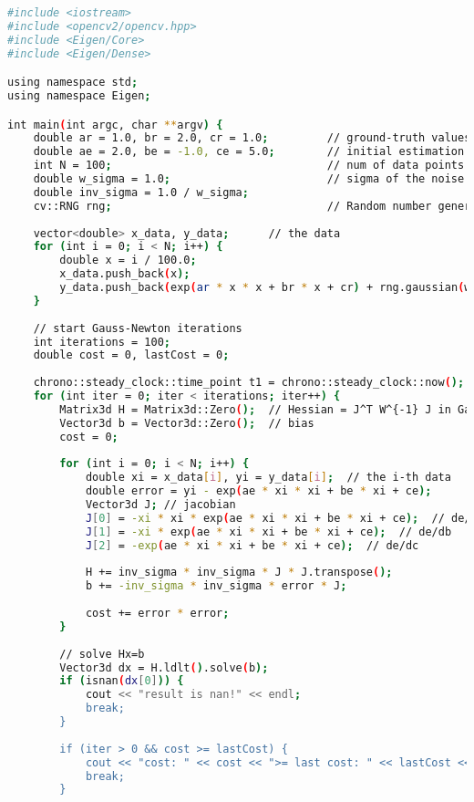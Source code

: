 \begin{lstlisting}[language=sh,caption=slambook2/ch6/gaussNewton.cpp]
#include <iostream>
#include <opencv2/opencv.hpp>
#include <Eigen/Core>
#include <Eigen/Dense>

using namespace std;
using namespace Eigen;

int main(int argc, char **argv) {
    double ar = 1.0, br = 2.0, cr = 1.0;         // ground-truth values
    double ae = 2.0, be = -1.0, ce = 5.0;        // initial estimation
    int N = 100;                                 // num of data points
    double w_sigma = 1.0;                        // sigma of the noise
    double inv_sigma = 1.0 / w_sigma;
    cv::RNG rng;                                 // Random number generator 
    
    vector<double> x_data, y_data;      // the data
    for (int i = 0; i < N; i++) {
        double x = i / 100.0;
        x_data.push_back(x);
        y_data.push_back(exp(ar * x * x + br * x + cr) + rng.gaussian(w_sigma * w_sigma));
    }
    
    // start Gauss-Newton iterations
    int iterations = 100;   
    double cost = 0, lastCost = 0;  
    
    chrono::steady_clock::time_point t1 = chrono::steady_clock::now();
    for (int iter = 0; iter < iterations; iter++) {            
        Matrix3d H = Matrix3d::Zero();  // Hessian = J^T W^{-1} J in Gauss-Newton
        Vector3d b = Vector3d::Zero();  // bias
        cost = 0;
        
        for (int i = 0; i < N; i++) {
            double xi = x_data[i], yi = y_data[i];  // the i-th data
            double error = yi - exp(ae * xi * xi + be * xi + ce);
            Vector3d J; // jacobian
            J[0] = -xi * xi * exp(ae * xi * xi + be * xi + ce);  // de/da
            J[1] = -xi * exp(ae * xi * xi + be * xi + ce);  // de/db
            J[2] = -exp(ae * xi * xi + be * xi + ce);  // de/dc
            
            H += inv_sigma * inv_sigma * J * J.transpose();
            b += -inv_sigma * inv_sigma * error * J;
            
            cost += error * error;
        }
        
        // solve Hx=b
        Vector3d dx = H.ldlt().solve(b);
        if (isnan(dx[0])) {
            cout << "result is nan!" << endl;
            break;
        }
        
        if (iter > 0 && cost >= lastCost) {
            cout << "cost: " << cost << ">= last cost: " << lastCost << ", break." << endl;
            break;
        }
        

\end{lstlisting}
